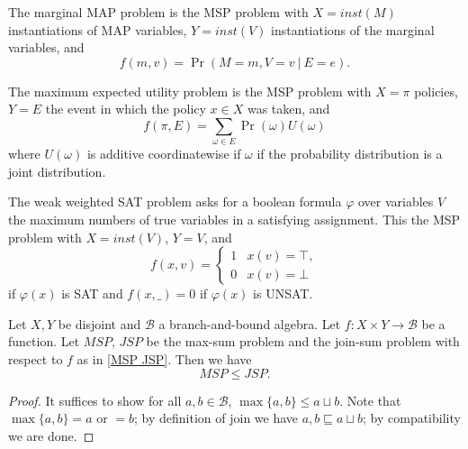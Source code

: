 \documentclass[acmsmall,review]{acmart}\settopmatter{printfolios=true,printccs=false,printacmref=false}
\begin{document}
\begin{example}
  The marginal MAP problem is the MSP problem with $X = inst(M)$ instantiations of MAP variables, $Y = inst(V)$ instantiations of the marginal variables, and $$f(m,v) = \Pr(M=m, V=v \ |\  E=e).$$
\end{example}

\begin{example}
  The maximum expected utility problem is the MSP problem with $X = \pi$ policies, $Y = E$ the event in which the policy $x \in X$ was taken, and 
    $$f(\pi, E) = \sum_{\omega \in E} \Pr(\omega) U(\omega)$$
  where $U(\omega)$ is additive coordinatewise if $\omega$ if the probability distribution is a joint distribution.
\end{example}

\begin{example}
  The weak weighted SAT problem asks for a boolean formula $\varphi$ over variables $V$ the maximum numbers of true variables in a satisfying assignment. This the MSP problem with $X = inst(V)$, $Y = V$, and 
  $$f(x,v) = \begin{cases}
    1 & x(v) = \top , \\ 0 & x(v) = \bot
  \end{cases}$$
  if $\varphi(x)$ is SAT and $f(x, \_) = 0$ if $\varphi(x)$ is UNSAT.
\end{example}

\begin{lemma}\label{weak}
  Let $X,Y$ be disjoint and $\mathcal B$ a branch-and-bound algebra. Let $f : X \times Y \to \mathcal B$ be a function. Let $MSP$, $JSP$ be the max-sum problem and the join-sum problem with respect to $f$ as in \ref{MSP JSP}. Then we have
  \begin{equation}
    MSP \leq JSP.
  \end{equation}
\end{lemma}

\begin{proof}
  It suffices to show for all $a,b \in \mathcal B$, $\max \{a,b\} \leq a \sqcup b$. Note that $\max\{a,b\}=a$ or $=b$; by definition of join we have $a,b \sqsubseteq a \sqcup b$; by compatibility we are done.
\end{proof}
\end{document}
